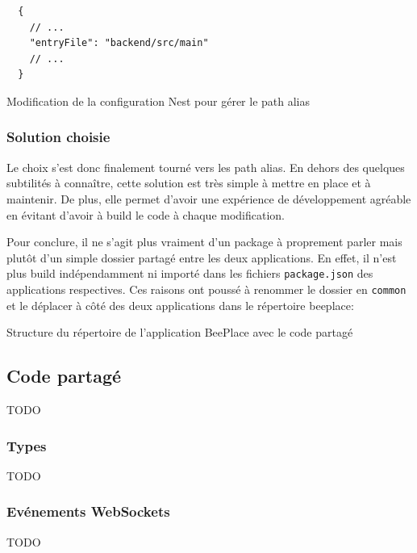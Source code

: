 \begin{listing}[H]
  \begin{verbatim}
  {
    // ...
    "entryFile": "backend/src/main"
    // ...
  }
\end{verbatim}
  \caption{Modification de la configuration Nest pour gérer le path alias}
  \label{listing:nest-entry-file}
\end{listing}

\subsubsection{Solution choisie}

Le choix s'est donc finalement tourné vers les path alias. En dehors des quelques subtilités à connaître, cette solution est très simple à mettre en place et à maintenir. De plus, elle permet d'avoir une expérience de développement agréable en évitant d'avoir à build le code à chaque modification.

Pour conclure, il ne s'agit plus vraiment d'un package à proprement parler mais plutôt d'un simple dossier partagé entre les deux applications. En effet, il n'est plus build indépendamment ni importé dans les fichiers \texttt{package.json} des applications respectives. Ces raisons ont poussé à renommer le dossier en \texttt{common} et le déplacer à côté des deux applications dans le répertoire beeplace:

\begin{listing}[H]
  \begin{tcolorbox}[arc=0mm,colback=white!5!white]
  \end{tcolorbox}
  \caption{Structure du répertoire de l'application BeePlace avec le code partagé}
  \label{listing:beeplace-repo-structure-v2}
\end{listing}

\subsection{Code partagé}

TODO

\subsubsection{Types}

TODO

\subsubsection{Evénements WebSockets}

TODO
